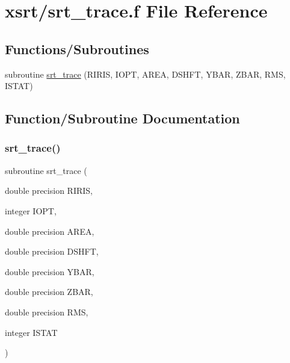 \hypertarget{srt__trace_8f}{}\section{xsrt/srt\+\_\+trace.f File Reference}
\label{srt__trace_8f}
\subsection*{Functions/\+Subroutines}
\begin{DoxyCompactItemize}
\item 
subroutine \hyperlink{srt__trace_8f_accd432a500024c994d81a939406e3a47}{srt\+\_\+trace} (R\+I\+R\+IS, I\+O\+PT, A\+R\+EA, D\+S\+H\+FT, Y\+B\+AR, Z\+B\+AR, R\+MS, I\+S\+T\+AT)
\end{DoxyCompactItemize}


\subsection{Function/\+Subroutine Documentation}
\mbox{\label{srt__trace_8f_accd432a500024c994d81a939406e3a47}} 
\subsubsection{\texorpdfstring{srt\+\_\+trace()}{srt\_trace()}}
{\footnotesize\ttfamily subroutine srt\+\_\+trace (\begin{DoxyParamCaption}\item[{double precision}]{R\+I\+R\+IS,  }\item[{integer}]{I\+O\+PT,  }\item[{double precision}]{A\+R\+EA,  }\item[{double precision}]{D\+S\+H\+FT,  }\item[{double precision}]{Y\+B\+AR,  }\item[{double precision}]{Z\+B\+AR,  }\item[{double precision}]{R\+MS,  }\item[{integer}]{I\+S\+T\+AT }\end{DoxyParamCaption})}


